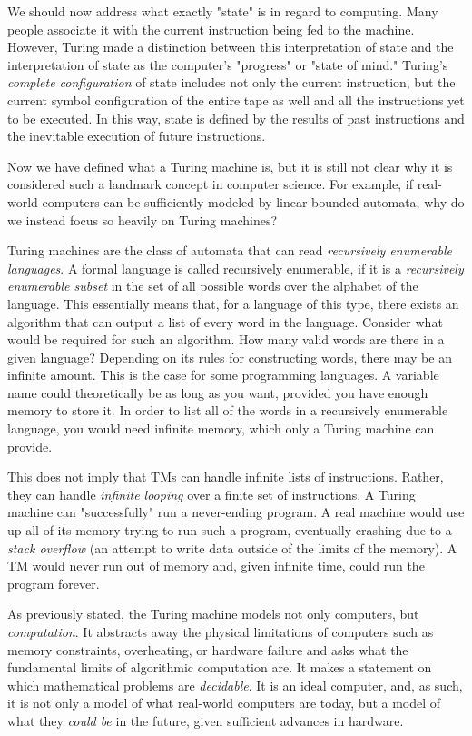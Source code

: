 We should now address what exactly "state" is in regard to computing. Many people associate it with the current instruction being fed to the machine. However, Turing made a distinction between this interpretation of state and the interpretation of state as the computer's "progress" or "state of mind." Turing's \textit{complete configuration} of state includes not only the current instruction, but the current symbol configuration of the entire tape as well and all the instructions yet to be executed. In this way, state is defined by the results of past instructions and the inevitable execution of future instructions.

Now we have defined what a Turing machine is, but it is still not clear why it is considered such a landmark concept in computer science. For example, if real-world computers can be sufficiently modeled by linear bounded automata, why do we instead focus so heavily on Turing machines?

Turing machines are the class of automata that can read \textit{recursively enumerable languages}. A formal language is called recursively enumerable, if it is a \textit{recursively enumerable subset} in the set of all possible words over the alphabet of the language. This essentially means that, for a language of this type, there exists an algorithm that can output a list of every word in the language. Consider what would be required for such an algorithm. How many valid words are there in a given language? Depending on its rules for constructing words, there may be an infinite amount. This is the case for some programming languages. A variable name could theoretically be as long as you want, provided you have enough memory to store it. In order to list all of the words in a recursively enumerable language, you would need infinite memory, which only a Turing machine can provide.

This does not imply that TMs can handle infinite lists of instructions. Rather, they can handle \textit{infinite looping} over a finite set of instructions. A Turing machine can "successfully" run a never-ending program. A real machine would use up all of its memory trying to run such a program, eventually crashing due to a \textit{stack overflow} (an attempt to write data outside of the limits of the memory). A TM would never run out of memory and, given infinite time, could run the program forever.

As previously stated, the Turing machine models not only computers, but \textit{computation}. It abstracts away the physical limitations of computers such as memory constraints, overheating, or hardware failure and asks what the fundamental limits of algorithmic computation are. It makes a statement on which mathematical problems are \textit{decidable}. It is an ideal computer, and, as such, it is not only a model of what real-world computers are today, but a model of what they \textit{could be} in the future, given sufficient advances in hardware.

